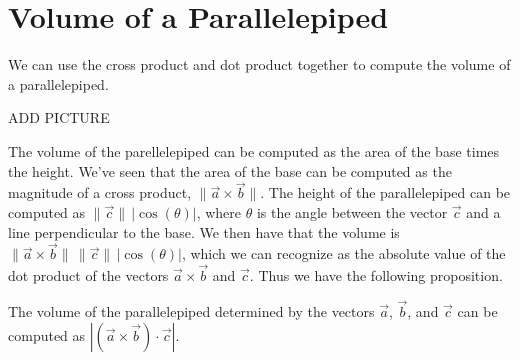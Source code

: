 \documentclass{ximera}
\begin{document}
\section{Volume of a Parallelepiped}

We can use the cross product and dot product together to compute the volume of a parallelepiped.

ADD PICTURE

The volume of the parellelepiped can be computed as the area of the base times the height. We've seen that the area of the base can be computed as the magnitude of a cross product, $\|\vec{a}\times\vec{b}\|$. The height of the parallelepiped can be computed as $\|\vec{c}\|\,|\cos(\theta)|$, where $\theta$ is the angle between the vector $\vec{c}$ and a line perpendicular to the base. We then have that the volume is $\|\vec{a}\times\vec{b}\|\,\|\vec{c}\|\,|\cos(\theta)|$, which we can recognize as the absolute value of the dot product of the vectors $\vec{a}\times\vec{b}$ and $\vec{c}$. Thus we have the following proposition.

\begin{proposition}
The volume of the parallelepiped determined by the vectors $\vec{a}$, $\vec{b}$, and $\vec{c}$ can be computed as $|(\vec{a}\times\vec{b})\cdot\vec{c}|$.
\end{proposition}
\end{document}
